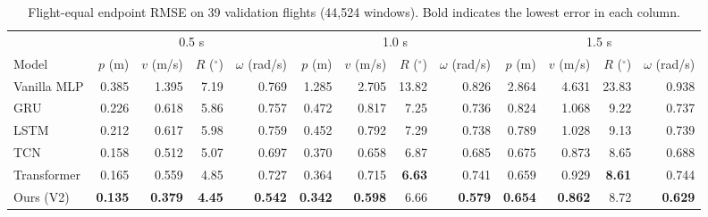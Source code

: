 \begin{table}[t]
\centering
\small
\caption{Flight-equal endpoint RMSE on 39 validation flights (44,524 windows). Bold indicates the lowest error in each column.}
\label{tab:flight-endpoints}
\setlength{\tabcolsep}{3pt}
\begin{tabular}{lrrrrrrrrrrrr}
\hline
 & \multicolumn{4}{c}{0.5 s} & \multicolumn{4}{c}{1.0 s} & \multicolumn{4}{c}{1.5 s} \\
\cline{2-5}\cline{6-9}\cline{10-13}
Model & $p$ (m) & $v$ (m/s) & $R$ ($^\circ$) & $\omega$ (rad/s) & $p$ (m) & $v$ (m/s) & $R$ ($^\circ$) & $\omega$ (rad/s) & $p$ (m) & $v$ (m/s) & $R$ ($^\circ$) & $\omega$ (rad/s) \\
\hline
Vanilla MLP & 0.385 & 1.395 & 7.19 & 0.769 & 1.285 & 2.705 & 13.82 & 0.826 & 2.864 & 4.631 & 23.83 & 0.938 \\
GRU & 0.226 & 0.618 & 5.86 & 0.757 & 0.472 & 0.817 & 7.25 & 0.736 & 0.824 & 1.068 & 9.22 & 0.737 \\
LSTM & 0.212 & 0.617 & 5.98 & 0.759 & 0.452 & 0.792 & 7.29 & 0.738 & 0.789 & 1.028 & 9.13 & 0.739 \\
TCN & 0.158 & 0.512 & 5.07 & 0.697 & 0.370 & 0.658 & 6.87 & 0.685 & 0.675 & 0.873 & 8.65 & 0.688 \\
Transformer & 0.165 & 0.559 & 4.85 & 0.727 & 0.364 & 0.715 & \textbf{6.63} & 0.741 & 0.659 & 0.929 & \textbf{8.61} & 0.744 \\
Ours (V2) & \textbf{0.135} & \textbf{0.379} & \textbf{4.45} & \textbf{0.542} & \textbf{0.342} & \textbf{0.598} & 6.66 & \textbf{0.579} & \textbf{0.654} & \textbf{0.862} & 8.72 & \textbf{0.629} \\
\hline
\end{tabular}
\end{table}
